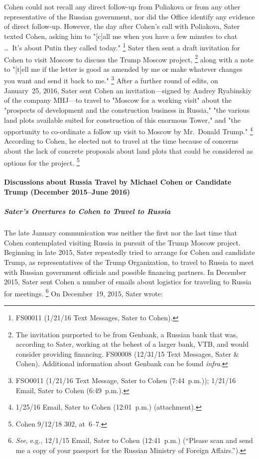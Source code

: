 Cohen could not recall any direct follow-up from Poliakova or from any other representative of the Russian government, nor did the Office identify any evidence of direct follow-up.
However, the day after Cohen's call with Poliakova, Sater texted Cohen, asking him to "[c]all me when you have a few minutes to chat \dots\ It's about Putin they called today."%
\footnote{FS00011 (1/21/16 Text Messages, Sater to Cohen).}
Sater then sent a draft invitation for Cohen to visit Moscow to discuss the Trump Moscow project,%
\footnote{The invitation purported to be from Genbank, a Russian bank that was, according to Sater, working at the behest of a larger bank, VTB, and would consider providing financing.
FS00008 (12/31/15 Text Messages, Sater \& Cohen).
Additional information about Genbank can be found \textit{infra}.}
along with a note to "[t]ell me if the letter is good as amended by me or make whatever changes you want and send it back to me."%
\footnote{FSO0011 (1/21/16 Text Message, Sater to Cohen (7:44~p.m.));
1/21/16 Email, Sater to Cohen (6:49~p.m.).}
After a further round of edits, on January~25, 2016, Sater sent Cohen an invitation---signed by Andrey Ryabinskiy of the company MHJ---to travel to "Moscow for a working visit" about the "prospects of development and the construction business in Russia," "the various land plots available suited for construction of this enormous Tower," and "the opportunity to co-ordinate a follow up visit to Moscow by Mr.~Donald Trump."%
\footnote{1/25/16 Email, Sater to Cohen (12:01~p.m.) (attachment).}
According to Cohen, he elected not to travel at the time because of concerns about the lack of concrete proposals about land plots that could be considered as options for the project.%
\footnote{Cohen 9/12/18 302, at~6--7.}

\paragraph{Discussions about Russia Travel by Michael Cohen or Candidate Trump (December 2015--June 2016)}

\subparagraph{Sater's Overtures to Cohen to Travel to Russia}

The late January communication was neither the first nor the last time that Cohen contemplated visiting Russia in pursuit of the Trump Moscow project.
Beginning in late 2015, Sater repeatedly tried to arrange for Cohen and candidate Trump, as representatives of the Trump Organization, to travel to Russia to meet with Russian government officials and possible financing partners.
In December 2015, Sater sent Cohen a number of emails about logistics for traveling to Russia for meetings.%
\footnote{\textit{See}, e.g., 12/1/15 Email, Sater to Cohen (12:41~p.m.)
(``Please scan and send me a copy of your passport for the Russian Ministry of Foreign Affairs.'').}
On December~19, 2015, Sater wrote:

